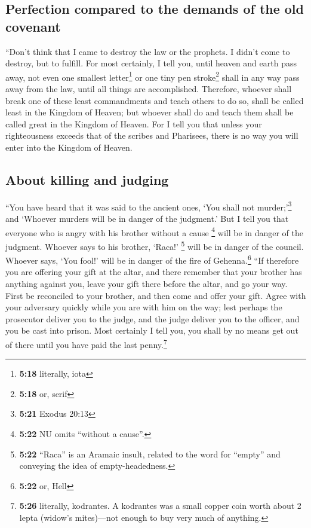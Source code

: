 \hypertarget{perfection-compared-to-the-demands-of-the-old-covenant}{%
\subsection{Perfection compared to the demands of the old
covenant}\label{perfection-compared-to-the-demands-of-the-old-covenant}}

 ``Don't think that I came to destroy the law or the
prophets. I didn't come to destroy, but to fulfill.  For
most certainly, I tell you, until heaven and earth pass away, not even
one smallest letter\footnote{\textbf{5:18} literally, iota} or one tiny
pen stroke\footnote{\textbf{5:18} or, serif} shall in any way pass away
from the law, until all things are accomplished. 
Therefore, whoever shall break one of these least commandments and teach
others to do so, shall be called least in the Kingdom of Heaven; but
whoever shall do and teach them shall be called great in the Kingdom of
Heaven.  For I tell you that unless your righteousness
exceeds that of the scribes and Pharisees, there is no way you will
enter into the Kingdom of Heaven.

\hypertarget{about-killing-and-judging}{%
\subsection{About killing and judging}\label{about-killing-and-judging}}

 ``You have heard that it was said to the ancient ones,
`You shall not murder;'\footnote{\textbf{5:21} Exodus 20:13} and
`Whoever murders will be in danger of the judgment.'  But
I tell you that everyone who is angry with his brother without a cause
\footnote{\textbf{5:22} NU omits ``without a cause''.} will be in danger
of the judgment. Whoever says to his brother, `Raca!' \footnote{\textbf{5:22}
  ``Raca'' is an Aramaic insult, related to the word for ``empty'' and
  conveying the idea of empty-headedness.} will be in danger of the
council. Whoever says, `You fool!' will be in danger of the fire of
Gehenna.\footnote{\textbf{5:22} or, Hell}  ``If therefore
you are offering your gift at the altar, and there remember that your
brother has anything against you,  leave your gift there
before the altar, and go your way. First be reconciled to your brother,
and then come and offer your gift.  Agree with your
adversary quickly while you are with him on the way; lest perhaps the
prosecutor deliver you to the judge, and the judge deliver you to the
officer, and you be cast into prison.  Most certainly I
tell you, you shall by no means get out of there until you have paid the
last penny.\footnote{\textbf{5:26} literally, kodrantes. A kodrantes was
  a small copper coin worth about 2 lepta (widow's mites)---not enough
  to buy very much of anything.}

